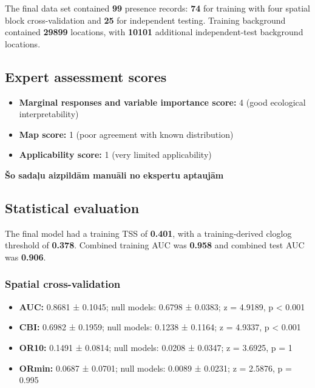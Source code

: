 \documentclass[
  openany]{book}
\providecommand{\tightlist}{%
  \setlength{\itemsep}{0pt}\setlength{\parskip}{0pt}}
\providecommand{\tightlist}{%
  \setlength{\itemsep}{0pt}%
  \setlength{\parskip}{0pt}%
}
\begin{document}
The final data set contained \textbf{99} presence records: \textbf{74} for training with four spatial block cross-validation and \textbf{25} for independent testing. Training background contained \textbf{29899} locations, with \textbf{10101} additional independent-test background locations.

\subsection*{Expert assessment scores}\label{expert-assessment-scores-14}

\begin{itemize}
\tightlist
\item
  \textbf{Marginal responses and variable importance score:} 4 (good ecological interpretability)
\item
  \textbf{Map score:} 1 (poor agreement with known distribution)
\item
  \textbf{Applicability score:} 1 (very limited applicability)
\end{itemize}

\textbf{Šo sadaļu aizpildām manuāli no ekspertu aptaujām}

\subsection*{Statistical evaluation}\label{statistical-evaluation-14}

The final model had a training TSS of \textbf{0.401}, with a training-derived cloglog threshold of \textbf{0.378}. Combined training AUC was \textbf{0.958} and combined test AUC was \textbf{0.906}.

\subsubsection*{Spatial cross-validation}\label{spatial-cross-validation-14}

\begin{itemize}
\tightlist
\item
  \textbf{AUC:} 0.8681 ± 0.1045; null models: 0.6798 ± 0.0383; z = 4.9189, p \textless{} 0.001
\item
  \textbf{CBI:} 0.6982 ± 0.1959; null models: 0.1238 ± 0.1164; z = 4.9337, p \textless{} 0.001
\item
  \textbf{OR10:} 0.1491 ± 0.0814; null models: 0.0208 ± 0.0347; z = 3.6925, p = 1
\item
  \textbf{ORmin:} 0.0687 ± 0.0701; null models: 0.0089 ± 0.0231; z = 2.5876, p = 0.995
\end{itemize}
\end{document}
